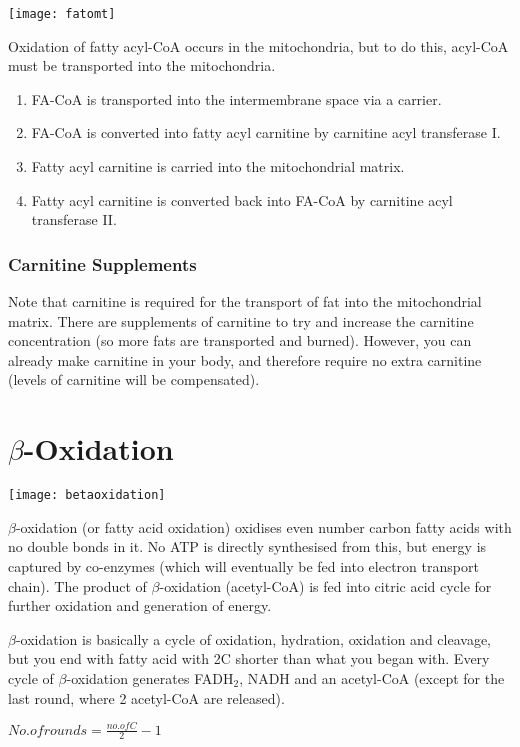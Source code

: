 \begin{center}
\texttt{[image: fatomt]}
\end{center}

Oxidation of fatty acyl-CoA occurs in the mitochondria, but to do this, acyl-CoA must be transported into the mitochondria.
\begin{enumerate}
\item FA-CoA is transported into the intermembrane space via a carrier.
\item FA-CoA is converted into fatty acyl carnitine by carnitine acyl transferase I.
\item Fatty acyl carnitine is carried into the mitochondrial matrix.
\item Fatty acyl carnitine is converted back into FA-CoA by carnitine acyl transferase II.
\end{enumerate}

\subsubsection{Carnitine Supplements}

Note that carnitine is required for the transport of fat into the mitochondrial matrix.
There are supplements of carnitine to try and increase the carnitine concentration (so more fats are transported and burned).
However, you can already make carnitine in your body, and therefore require no extra carnitine (levels of carnitine will be compensated).

\section{$\beta$-Oxidation}

\begin{center}
\texttt{[image: betaoxidation]}
\end{center}

$\beta$-oxidation (or fatty acid oxidation) oxidises even number carbon fatty acids with no double bonds in it.
No ATP is directly synthesised from this, but energy is captured by co-enzymes (which will eventually be fed into electron transport chain).
The product of $\beta$-oxidation (acetyl-CoA) is fed into citric acid cycle for further oxidation and generation of energy.

$\beta$-oxidation is basically a cycle of oxidation, hydration, oxidation and cleavage, but you end with fatty acid with 2C shorter than what you began with.
Every cycle of $\beta$-oxidation generates FADH$_2$, NADH and an acetyl-CoA (except for the last round, where 2 acetyl-CoA are released).

\begin{center}
$No. of rounds = \frac{no.of C}{2}-1$
\end{center}

